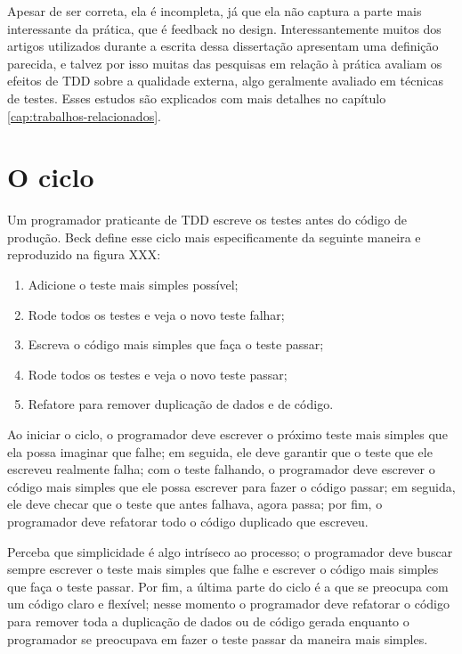 Apesar de ser correta, ela é incompleta, já que ela não captura a parte mais
interessante da prática, que é feedback no design. Interessantemente muitos
dos artigos utilizados durante a escrita dessa dissertação apresentam uma
definição parecida, e talvez por isso muitas das pesquisas em relação à prática
avaliam os efeitos de TDD sobre a qualidade externa, algo geralmente avaliado em
técnicas de testes. Esses estudos são explicados com mais detalhes no capítulo
\ref{cap:trabalhos-relacionados}.

\section{O ciclo}

Um programador praticante de TDD escreve os testes antes do código de produção.
Beck define esse ciclo mais especificamente da seguinte maneira
\cite{TDDByExample} e reproduzido na figura XXX:

\begin{enumerate}
	\item Adicione o teste mais simples possível; 
	\item Rode todos os testes e veja o novo teste falhar; 
	\item Escreva o código mais simples que faça o teste passar; 
	\item Rode todos os testes e veja o novo teste passar; 
	\item Refatore para remover duplicação de dados e de código.
\end{enumerate}

Ao iniciar o ciclo, o programador deve escrever o próximo teste mais simples que
ela possa imaginar que falhe; em seguida, ele deve garantir que o teste que ele
escreveu realmente falha; com o teste falhando, o programador deve escrever o
código mais simples que ele possa escrever para fazer o código passar; em
seguida, ele deve checar que o teste que antes falhava, agora passa; por fim, o
programador deve refatorar todo o código duplicado que escreveu.

Perceba que simplicidade é algo intríseco ao processo; o programador deve buscar
sempre escrever o teste mais simples que falhe e escrever o código mais simples
que faça o teste passar. Por fim, a última parte do ciclo é a que se preocupa
com um código claro e flexível; nesse momento o programador deve refatorar o
código para remover toda a duplicação de dados ou de código gerada enquanto o
programador se preocupava em fazer o teste passar da maneira mais simples.


